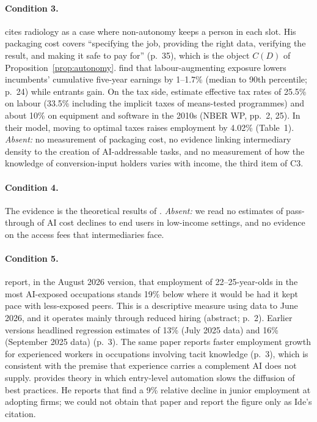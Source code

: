 \documentclass[12pt]{article}
\theoremstyle{remark}
\begin{document}
\paragraph{Condition 3.} \citet[pp.~34--35]{garicano2026comment} cites radiology as a case where non-autonomy keeps a person in each slot. His packaging cost covers ``specifying the job, providing the right data, verifying the result, and making it safe to pay for'' (p.~35), which is the object $C(D)$ of Proposition~\ref{prop:autonomy}. \citet{kogan2023displacement} find that labour-augmenting exposure lowers incumbents' cumulative five-year earnings by 1--1.7\% (median to 90th percentile; p.~24) while entrants gain. On the tax side, \citet{acemoglu2020tax} estimate effective tax rates of 25.5\% on labour (33.5\% including the implicit taxes of means-tested programmes) and about 10\% on equipment and software in the 2010s (NBER WP, pp.~2, 25). In their model, moving to optimal taxes raises employment by 4.02\% (Table~1). \emph{Absent:} no measurement of packaging cost, no evidence linking intermediary density to the creation of AI-addressable tasks, and no measurement of how the knowledge of conversion-input holders varies with income, the third item of C3.

\paragraph{Condition 4.} The evidence is the theoretical results of \citet[pp.~99, 106, 110--111]{athey2026competition}. \emph{Absent:} we read no estimates of pass-through of AI cost declines to end users in low-income settings, and no evidence on the access fees that intermediaries face.

\paragraph{Condition 5.} \citet{brynjolfsson2025canaries} report, in the August 2026 version, that employment of 22--25-year-olds in the most AI-exposed occupations stands 19\% below where it would be had it kept pace with less-exposed peers. This is a descriptive measure using data to June 2026, and it operates mainly through reduced hiring (abstract; p.~2). Earlier versions headlined regression estimates of 13\% (July 2025 data) and 16\% (September 2025 data) (p.~3). The same paper reports faster employment growth for experienced workers in occupations involving tacit knowledge (p.~3), which is consistent with the premise that experience carries a complement AI does not supply. \citet[pp.~26--28]{ide2025automation} provides theory in which entry-level automation slows the diffusion of best practices. He reports that \citet{hosseini2025seniority} find a 9\% relative decline in junior employment at adopting firms; we could not obtain that paper and report the figure only as Ide's citation.
\end{document}
